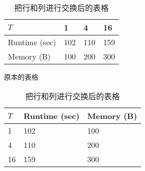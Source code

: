 \documentclass{article}
\begin{document}
\begin{table}[h]
    \begin{minipage}{0.48\linewidth}
        \centering
        \begin{tabular}{@{}llll@{}} \toprule
            $T$ & 1 & 4 & 16 \\ \midrule
            Runtime (sec)       & 102 & 110 & 159 \\ 
            Memory (B)  & 100 & 200 & 300 \\ \bottomrule   
        \end{tabular}
        \caption{原本的表格}
        \label{tbl:use_case8}
    \end{minipage}
    \hfill
    \begin{minipage}{0.48\linewidth}
        \centering
        \begin{tabular}{@{}lll@{}} \toprule
            $T$ & Runtime (sec) & Memory (B) \\ \midrule 
            1 & 102 & 100 \\
            4 & 110 & 200 \\
            16 & 159 & 300 \\ \bottomrule 
        \end{tabular}
        \caption{把行和列进行交换后的表格}
        \label{tbl:use_case9}
    \end{minipage}
\end{table}
\end{document}
